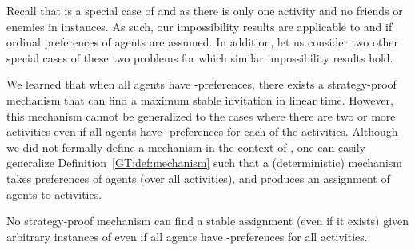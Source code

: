





Recall that \AOIPs is a special case of \GASPs and \SIPs as there is only one activity and no friends or enemies in \AOIPs instances. As such, our impossibility results are applicable to \GASPs and \SIPs if ordinal preferences of agents are assumed. In addition, let us consider two other special cases of these two problems for which similar impossibility results hold.

We learned that when all agents have \INC-preferences, there exists a strategy-proof mechanism that can find a maximum stable invitation in linear time. However, this mechanism cannot be generalized to the cases where there are two or more activities even if all agents have \INC-preferences for each of the activities. Although we did not formally define a mechanism in the context of \GASP, one can easily generalize Definition~\ref{GT:def:mechanism} such that a (deterministic) mechanism takes preferences of agents (over all activities), and produces an assignment of agents to activities. 
\begin{theorem} \label{GT:thm:impossibility_inc_gasp}
No strategy-proof mechanism can find a stable assignment (even if it exists) given arbitrary instances of \GASPs even if all agents have \INC-preferences for all activities. 
\end{theorem}
